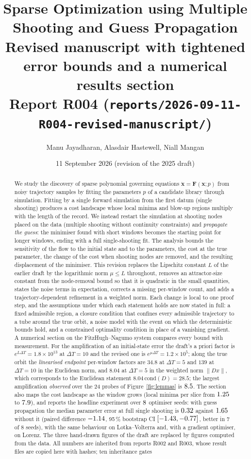 \documentclass[11pt]{article}
\title{\textbf{Sparse Optimization using Multiple Shooting and Guess Propagation}\\
\large Revised manuscript with tightened error bounds and a numerical results section\\
\normalsize Report R004 (\texttt{reports/2026-09-11-R004-revised-manuscript/})}
\author{Manu Jayadharan, Alasdair Hastewell, Niall Mangan}
\date{11 September 2026 (revision of the 2025 draft)}
\theoremstyle{remark}\newtheorem{remark}{Remark}
\newcommand{\norm}[1]{\lVert #1\rVert}
\newcommand{\rev}[1]{\textcolor{blue!55!black}{#1}}
\begin{document}
\maketitle

\begin{abstract}\noindent
We study the discovery of sparse polynomial governing equations $\dot{\mathbf x}=\mathbf F(\mathbf x;p)$ from noisy trajectory samples by fitting the parameters $p$ of a candidate library through simulation. Fitting by a single forward simulation from the first datum (single shooting) produces a cost landscape whose local minima and blow-up regions multiply with the length of the record. We instead restart the simulation at shooting nodes placed on the data (multiple shooting without continuity constraints) and \emph{propagate the guess}: the minimiser found with short windows becomes the starting point for longer windows, ending with a full single-shooting fit. The analysis bounds the sensitivity of the flow to the initial state and to the parameters, the cost at the true parameter, the change of the cost when shooting nodes are removed, and the resulting displacement of the minimiser. \rev{This revision replaces the Lipschitz constant $L$ of the earlier draft by the logarithmic norm $\mu\le L$ throughout, removes an attractor-size constant from the node-removal bound so that it is quadratic in the small quantities, states the noise terms in expectation, corrects a missing per-window count, and adds a trajectory-dependent refinement in a weighted norm. Each change is local to one proof step, and the assumptions under which each statement holds are now stated in full: a fixed admissible region, a closure condition that confines every admissible trajectory to a tube around the true orbit, a noise model with the event on which the deterministic bounds hold, and a constrained optimality condition in place of a vanishing gradient.} A numerical section on the FitzHugh--Nagumo system compares every bound with measurement. For the amplification of an initial-state error the draft's a priori factor is $e^{L\Delta T}=1.8\times10^{13}$ at $\Delta T=10$ and the revised one is $e^{\mu\Delta T}=1.2\times10^{5}$; along the true orbit the \emph{linearised endpoint} per-window factors are $34.8$ at $\Delta T=5$ and $139$ at $\Delta T=10$ in the Euclidean norm, and $8.04$ at $\Delta T=5$ in the weighted norm $\norm{Dx}$, which corresponds to the Euclidean statement $8.04\,\mathrm{cond}(D)=28.5$; the largest amplification \emph{observed} over the 24 probes of Figure~\ref{fig:lemmas} is $8.5$. The section also maps the cost landscape as the window grows (local minima per slice from $1.25$ to $7.9$), and reports the headline experiment over $8$ optimiser seeds: with guess propagation the median parameter error at full single shooting is $0.32$ against $1.65$ without it (paired difference $-1.14$, 95\,\% bootstrap CI $[-1.43,-0.77]$, better in 7 of 8 seeds), with the same behaviour on Lotka--Volterra and, with a gradient optimiser, on Lorenz. The three hand-drawn figures of the draft are replaced by figures computed from the data. All numbers are inherited from reports R002 and R003, whose result files are copied here with hashes; ten inheritance gates 
\end{abstract}
\end{document}
